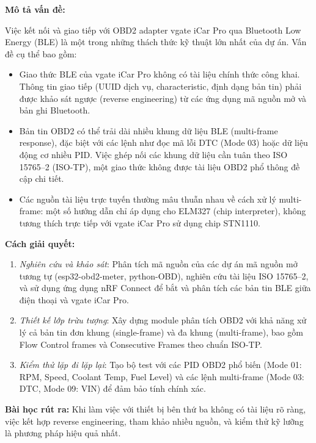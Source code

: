 \documentclass[13pt,a4paper]{extarticle}
\renewcommand{\\}{\thesislongtableorignewline\hline}%
\providecommand{\tightlist}{%
  \setlength{\itemsep}{0pt}\setlength{\parskip}{0pt}}
\begin{document}
\textbf{Mô tả vấn đề:}

Việc kết nối và giao tiếp với OBD2 adapter vgate iCar Pro qua Bluetooth
Low Energy (BLE) là một trong những thách thức kỹ thuật lớn nhất của dự
án. Vấn đề cụ thể bao gồm:

\begin{itemize}
\tightlist
\item
  Giao thức BLE của vgate iCar Pro không có tài liệu chính thức công
  khai. Thông tin giao tiếp (UUID dịch vụ, characteristic, định dạng bản
  tin) phải được khảo sát ngược (reverse engineering) từ các ứng dụng mã
  nguồn mở và bản ghi Bluetooth.
\item
  Bản tin OBD2 có thể trải dài nhiều khung dữ liệu BLE (multi-frame
  response), đặc biệt với các lệnh như đọc mã lỗi DTC (Mode 03) hoặc dữ
  liệu động cơ nhiều PID. Việc ghép nối các khung dữ liệu cần tuân theo
  ISO 15765--2 (ISO-TP), một giao thức không được tài liệu OBD2 phổ
  thông đề cập chi tiết.
\item
  Các nguồn tài liệu trực tuyến thường mâu thuẫn nhau về cách xử lý
  multi-frame: một số hướng dẫn chỉ áp dụng cho ELM327 (chip
  interpreter), không tương thích trực tiếp với vgate iCar Pro sử dụng
  chip STN1110.
\end{itemize}

\textbf{Cách giải quyết:}

\begin{enumerate}
\def\labelenumi{\arabic{enumi}.}
\tightlist
\item
  \emph{Nghiên cứu và khảo sát}: Phân tích mã nguồn của các dự án mã
  nguồn mở tương tự (esp32-obd2-meter, python-OBD), nghiên cứu tài liệu
  ISO 15765--2, và sử dụng ứng dụng nRF Connect để bắt và phân tích các
  bản tin BLE giữa điện thoại và vgate iCar Pro.
\item
  \emph{Thiết kế lớp trừu tượng}: Xây dựng module phân tích OBD2 với khả
  năng xử lý cả bản tin đơn khung (single-frame) và đa khung
  (multi-frame), bao gồm Flow Control frames và Consecutive Frames theo
  chuẩn ISO-TP.
\item
  \emph{Kiểm thử lặp đi lặp lại}: Tạo bộ test với các PID OBD2 phổ biến
  (Mode 01: RPM, Speed, Coolant Temp, Fuel Level) và các lệnh
  multi-frame (Mode 03: DTC, Mode 09: VIN) để đảm bảo tính chính xác.
\end{enumerate}

\textbf{Bài học rút ra:} Khi làm việc với thiết bị bên thứ ba không có
tài liệu rõ ràng, việc kết hợp reverse engineering, tham khảo nhiều
nguồn, và kiểm thử kỹ lưỡng là phương pháp hiệu quả nhất.
\end{document}
